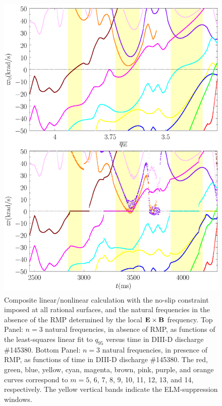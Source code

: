 \documentclass[12pt,prb,aps]{revtex4-1}
\begin{document}
\begin{figure}
\includegraphics[height=6in]{fig2.pdf}
\caption{Composite linear/nonlinear calculation with the no-slip constraint imposed at all rational surfaces, and the natural frequencies
in the absence of the RMP determined by the local  ${\bf E}\times {\bf B}$
frequency.
Top Panel: $n=3$ natural frequencies, in absence of RMP, as functions of the least-squares linear fit to $q_{95}$ versus time
in   DIII-D discharge \#145380. Bottom Panel:  $n=3$ natural frequencies, in presence of RMP, as functions of time
in   DIII-D discharge \#145380. The red, green, blue, yellow, cyan, magenta, brown, pink,
purple, and orange  curves correspond to $m=5$, 6, 7, 8, 9, 10, 11, 12, 13, and 14, respectively. The yellow vertical bands indicate the ELM-suppression windows.} \label{fig2}
\end{figure}
\end{document}
